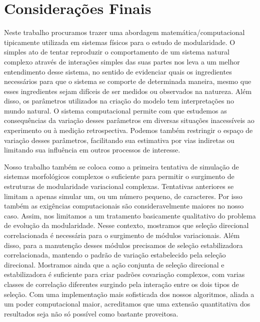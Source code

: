 \pagestyle{empty}
\cleardoublepage
\pagestyle{fancy}
\chapter{Considerações Finais}
\label{cap5}

Neste trabalho procuramos trazer uma abordagem matemática/computacional
tipicamente utilizada em sistemas físicos para o estudo de
modularidade. 
O simples ato de tentar reproduzir o comportamento de um sistema natural
complexo através de interações simples das suas partes nos leva a um melhor
entendimento desse sistema, no sentido de evidenciar quais os
ingredientes necessários para que o sistema se comporte de determinada
maneira, mesmo que esses ingredientes sejam difíceis de ser medidos ou
observados na natureza. 
Além disso, os parâmetros utilizados na criação do modelo tem
interpretações no mundo natural. 
O sistema computacional permite com que estudemos as consequências da
variação desses parâmetros em diversas situações inacessíveis ao
experimento ou à medição retrospectiva. 
Podemos também restringir o espaço de variação desses parâmetros,
facilitando sua estimativa por vias indiretas ou limitando sua
influência em outros processos de interesse. 

Nosso trabalho também se coloca como a primeira tentativa de simulação
de sistemas morfológicos complexos o suficiente para permitir o
surgimento de estruturas de modularidade variacional complexas. 
Tentativas anteriores se limitam a apenas simular um, ou um número
pequeno, de caracteres. 
Por isso também as exigências computacionais são consideravelmente
maiores no nosso caso. 
Assim, nos limitamos a um tratamento basicamente qualitativo do problema
de evolução da modularidade. 
Nesse contexto, mostramos que seleção direcional correlacionada é
necessária para o surgimento de módulos variacionais. 
Além disso, para a manutenção desses módulos precisamos de seleção
estabilizadora correlacionada, mantendo o padrão de variação
estabelecido pela seleção direcional.
Mostramos ainda que a ação conjunta de seleção direcional e
estabilizadora é suficiente para criar padrões covariação complexos, com
varias classes de correlação diferentes surgindo pela interação entre
os dois tipos de seleção.
Com uma implementação mais sofisticada dos
nossos algoritmos, aliada a um poder computacional maior, acreditamos
que uma extensão quantitativa dos resultados seja não só possível como
bastante proveitosa. 

